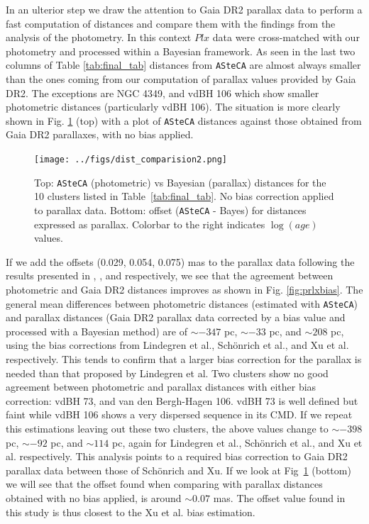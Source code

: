 \documentclass[draft]{aa}
\begin{document}
In an ulterior step we draw the attention to Gaia DR2 parallax data to perform
a fast computation of distances and compare them with the findings from the
analysis of the photometry. In this context $Plx$ data were cross-matched
with our photometry and processed within a Bayesian framework.
As seen in the last two columns of Table \ref{tab:final_tab} distances from
\texttt{ASteCA} are almost always smaller than the ones coming
from our computation of parallax values provided by Gaia DR2.
The exceptions are NGC 4349, and vdBH 106 which show smaller photometric
distances (particularly vdBH 106).
%
The situation is more clearly shown in Fig. \ref{fig:prlxnobias}  (top) with a
plot of \texttt{ASteCA} distances against those obtained from Gaia DR2
parallaxes, with no bias applied.

\begin{figure}[ht]
    \centering
    \texttt{[image: ../figs/dist\_comparision2.png]}
    \caption{Top: \texttt{ASteCA} (photometric) vs Bayesian (parallax)
    distances for the 10 clusters listed in Table~\ref{tab:final_tab}. No bias
    correction applied to parallax data.
    Bottom: offset (\texttt{ASteCA} - Bayes) for distances expressed
    as parallax. Colorbar to the right indicates $\log(age)$ values.}
    \label{fig:prlxnobias}
\end{figure}

If we add the offsets (0.029, 0.054, 0.075) mas to the parallax data following
the results presented in \cite{Lindegren_2018}, \cite{Schonrich2019}, and
\cite{Xu_2019} respectively, we see that the agreement between photometric and
Gaia DR2 distances improves as shown in Fig. \ref{fig:prlxbias}.
%
The general mean differences between photometric distances (estimated with 
\texttt{ASteCA}) and parallax distances (Gaia DR2 parallax data corrected by a
bias value and processed with a Bayesian method) are of $\sim-347$ pc,
$\sim-33$ pc, and $\sim208$ pc, using the bias corrections from Lindegren et
al., Sch\"onrich et al., and Xu et al. respectively. This tends to confirm that
a larger bias correction for the parallax is needed than that proposed by
Lindegren et al.
%
Two clusters show no good agreement between photometric and parallax
distances with either bias correction: vdBH 73, and van den Bergh-Hagen 106.
vdBH 73 is well defined but faint while vdBH 106 shows a very dispersed
sequence in its CMD.
%
If we repeat this estimations leaving out these two clusters, the above values
change to $\sim-398$ pc, $\sim-92$ pc, and $\sim114$ pc, again for Lindegren et
al., Sch\"onrich et al., and Xu et al. respectively. This analysis points to a
required bias correction to Gaia DR2 parallax data between those of
Sch\"onrich and Xu. If we look at Fig~\ref{fig:prlxnobias} (bottom) we will see
that the offset found when comparing with parallax distances obtained with no
bias applied, is around $\sim0.07$ mas. The offset value found in this study is
thus closest to the Xu et al. bias estimation.
\end{document}
